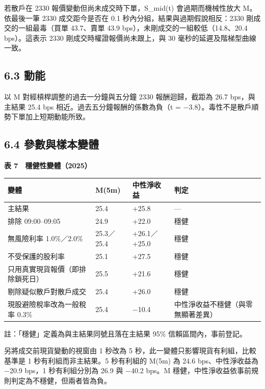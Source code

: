 \documentclass[12pt,a4paper]{article}
\begin{document}
若散戶在 2330 報價變動但尚未成交時下單，S\_mid(t) 會過期而機械性放大 M。依最後一筆 2330 成交距今是否在 0.1 秒內分組，結果與過期假說相反：2330 剛成交的一組最毒（買單 43.7、賣單 43.9 bps），未剛成交的一組較低（14.8、20.4 bps）。這表示 2330 剛成交時權證報價尚未跟上，與 30 毫秒的延遲及階梯型曲線一致。

\subsection*{6.3 動能}

以 M 對經槓桿調整的過去一分鐘與五分鐘 2330 報酬迴歸，截距為 26.7 bps，與主結果 25.4 bps 相近。過去五分鐘報酬的係數為負（t = −3.8）。毒性不是散戶順勢下單加上短期動能所致。

\subsection*{6.4 參數與樣本變體}

\begin{center}\textbf{表 7　穩健性變體（2025）}\end{center}\vspace{-0.8em}

\begin{center}\small
\begin{tabularx}{\linewidth}{YllY}
\toprule
\textbf{變體} & \textbf{M(5m)} & \textbf{中性淨收益} & \textbf{判定} \\
\midrule
主結果 & 25.4 & +25.8 & — \\
排除 09:00–09:05 & 24.9 & +22.0 & 穩健 \\
無風險利率 1.0\%／2.0\% & 25.3／25.4 & +26.1／+25.0 & 穩健 \\
不受保護的股利率 & 25.1 & +27.5 & 穩健 \\
只用真實現貨報價（即排除鎖死日） & 25.5 & +21.6 & 穩健 \\
剔除疑似散戶對散戶成交 & 25.4 & +26.0 & 穩健 \\
現股避險稅率改為一般稅率 0.3\% & 25.4 & −10.4 & 中性淨收益不穩健（與零無顯著差異） \\
\bottomrule
\end{tabularx}
\end{center}

{\small\noindent 註：「穩健」定義為與主結果同號且落在主結果 95\% 信賴區間內，事前登記。\par}

另將成交前現貨變動的視窗由 1 秒改為 5 秒，此一變體只影響現貨有利組，比較基準是 1 秒有利組而非主結果。5 秒有利組的 M(5m) 為 24.6 bps、中性淨收益為 −20.9 bps，1 秒有利組分別為 26.9 與 −40.2 bps。M 穩健，中性淨收益依事前規則判定為不穩健，但兩者皆為負。
\end{document}
